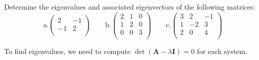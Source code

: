 \documentclass[12pts, answers]{exam}
\newcommand{\ve}[1]{\ensuremath{\mathbf{#1}}}
\begin{document}
\begin{questions}
\vspace*{3em}
\addpoints
\question[10] Determine the eigenvalues and associated eigenvectors of the following matrices:
%
\renewcommand{\aaa}{2}
\renewcommand{\aab}{-1}
\renewcommand{\aba}{-1}
\renewcommand{\abb}{2}
\renewcommand{\baa}{2}
\renewcommand{\bab}{1}
\renewcommand{\bac}{0}
\renewcommand{\bba}{1}
\renewcommand{\bbb}{2}
\renewcommand{\bbc}{0}
\renewcommand{\bca}{0}
\renewcommand{\bcb}{0}
\renewcommand{\bcc}{3}
\renewcommand{\caa}{3}
\renewcommand{\cab}{2}
\renewcommand{\cac}{-1}
\renewcommand{\cba}{1}
\renewcommand{\cbb}{-2}
\renewcommand{\cbc}{3}
\renewcommand{\cca}{2}
\renewcommand{\ccb}{0}
\renewcommand{\ccc}{4}
\begin{equation}
\text{a.} \begin{pmatrix}
   \aaa & \aab \\
   \aba & \abb \\
\end{pmatrix} \qquad
%
\text{b.} \begin{pmatrix}
   \baa & \bab & \bac \\
   \bba & \bbb & \bbc \\
   \bca & \bcb & \bcc \\
\end{pmatrix} \qquad
%
\text{c.} \begin{pmatrix}
  \caa & \cab & \cac \\
  \cba & \cbb & \cbc \\
  \cca & \ccb & \ccc \\
\end{pmatrix} \nonumber
\end{equation}

\begin{solution}
To find eigenvalues, we need to compute $\det(\ve{A} - \lambda \ve{I})=0$ for each system.

\end{solution}
\end{questions}
\end{document}
